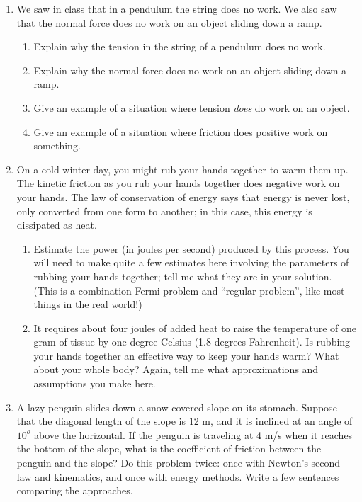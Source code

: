 \documentclass[12pt]{article}
\begin{document}
\Large
\centerline{}
\normalsize
\centerline{}

\begin{enumerate}

  \item{We saw in class that in a pendulum the string does no work. We also saw that the normal force does no work on an object sliding down a ramp.}
    \begin{enumerate}
      \item{Explain why the tension in the string of a pendulum does no work.}
      \item{Explain why the normal force does no work on an object sliding down a ramp.}
      \item{Give an example of a situation where tension {\it does} do work on an object.}
      \item{Give an example of a situation where friction does positive work on something.}
    \end{enumerate}

\item On a cold winter day, you might rub your hands together to warm them up. The kinetic friction as you rub your hands together does negative work on your hands.
The law of conservation of energy says that energy is never lost, only converted from one form to another; in this case,
this energy is dissipated as heat. 
\begin{enumerate}
\item Estimate the power (in joules per second) produced by this process. You will need to make quite a few estimates here involving the
parameters of rubbing your hands together; tell me what they are in your solution. (This is a combination Fermi problem and ``regular problem'', like most things in the real world!)
  
\item It requires about four joules of added heat to raise the temperature of one gram of tissue by one degree Celsius (1.8 degrees Fahrenheit). 
Is rubbing your hands together an effective way to keep your hands warm?
What about your whole body? Again, tell me what approximations and assumptions you make here.
\end{enumerate}

  \item{A lazy penguin slides down a snow-covered slope on its stomach. Suppose that the diagonal length of the slope is 12 m, and it is inclined at an angle of $10^o$ above the horizontal. If the penguin is traveling at 4 m/s when it 
    reaches the bottom of the slope, what is the coefficient of friction between the penguin and the slope? Do this problem twice: once with Newton's second law and kinematics, and once with energy methods. Write a few sentences comparing the 
  approaches.}


\end{enumerate}
\end{document}
